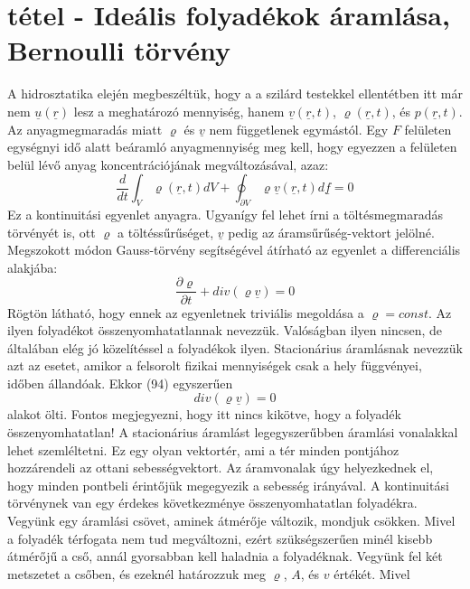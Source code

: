 \documentclass[a4paper,12pt]{article}
\begin{document}
\section{tétel - Ideális folyadékok áramlása, Bernoulli törvény}
A hidrosztatika elején megbeszéltük, hogy a a szilárd testekkel ellentétben itt már nem $\underline{u}(\underline{r})$ lesz a meghatározó mennyiség, hanem $\underline{v}(\underline{r},t)$, $\varrho(\underline{r},t)$, és $p(\underline{r},t)$. Az anyagmegmaradás miatt $\varrho$ és $\underline{v}$ nem függetlenek egymástól. Egy $F$ felületen egységnyi idő alatt beáramló anyagmennyiség meg kell, hogy egyezzen a felületen belül lévő anyag koncentrációjának megváltozásával, azaz:
\begin{equation}
\frac{d}{dt}\int_V\varrho(\underline{r},t)dV+\oint_{\partial V}\varrho\underline{v}(\underline{r},t)d\underline{f}=0
\end{equation}
Ez a kontinuitási egyenlet anyagra. Ugyanígy fel lehet írni a töltésmegmaradás törvényét is, ott $\varrho$ a töltéssűrűséget, $\underline{v}$ pedig az áramsűrűség-vektort jelölné. Megszokott módon Gauss-törvény segítségével átírható az egyenlet a differenciális alakjába:
\begin{equation}
\frac{\partial\varrho}{\partial t}+div(\varrho\underline{v})=0
\end{equation}
Rögtön látható, hogy ennek az egyenletnek triviális megoldása a $\varrho=const$. Az ilyen folyadékot összenyomhatatlannak nevezzük. Valóságban ilyen nincsen, de általában elég jó közelítéssel a folyadékok ilyen.
Stacionárius áramlásnak nevezzük azt az esetet, amikor a felsorolt fizikai mennyiségek csak a hely függvényei, időben állandóak. Ekkor (94) egyszerűen
\begin{equation}
div(\varrho\underline{v})=0
\end{equation}
alakot ölti. Fontos megjegyezni, hogy itt nincs kikötve, hogy a folyadék összenyomhatatlan!
A stacionárius áramlást legegyszerűbben áramlási vonalakkal lehet szemléltetni. Ez egy olyan vektortér, ami a tér minden pontjához hozzárendeli az ottani sebességvektort. Az áramvonalak úgy helyezkednek el, hogy minden pontbeli érintőjük megegyezik a sebesség irányával.
A kontinuitási törvénynek van egy érdekes következménye összenyomhatatlan folyadékra. Vegyünk egy áramlási csövet, aminek átmérője változik, mondjuk csökken. Mivel a folyadék térfogata nem tud megváltozni, ezért szükségszerűen minél kisebb átmérőjű a cső, annál gyorsabban kell haladnia a folyadéknak. Vegyünk fel két metszetet a csőben, és ezeknél határozzuk meg $\varrho$, $A$, és $v$ értékét. Mivel
\end{document}
